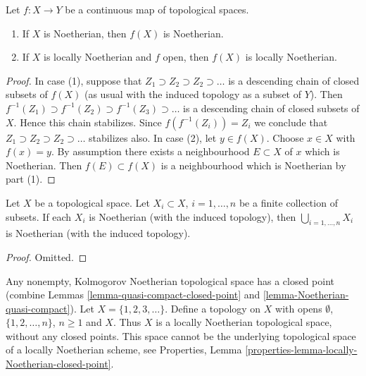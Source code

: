 \begin{lemma}
\label{lemma-image-Noetherian}
Let $f : X \to Y$ be a continuous map of topological spaces.
\begin{enumerate}
\item If $X$ is Noetherian, then $f(X)$ is Noetherian.
\item If $X$ is locally Noetherian and $f$ open, then $f(X)$ is
locally Noetherian.
\end{enumerate}
\end{lemma}

\begin{proof}
In case (1), suppose that $Z_1 \supset Z_2 \supset Z_2 \supset \ldots$
is a descending chain of closed subsets of $f(X)$ (as usual with the induced
topology as a subset of $Y$). Then
$f^{-1}(Z_1) \supset f^{-1}(Z_2) \supset f^{-1}(Z_3) \supset \ldots$ is
a descending chain of closed subsets of $X$. Hence this chain stabilizes.
Since $f(f^{-1}(Z_i)) = Z_i$ we conclude that
$Z_1 \supset Z_2 \supset Z_2 \supset \ldots$
stabilizes also. In case (2), let $y \in f(X)$. Choose $x \in X$ with
$f(x) = y$. By assumption there exists a neighbourhood $E \subset X$ of
$x$ which is Noetherian. Then $f(E) \subset f(X)$ is a neighbourhood
which is Noetherian by part (1).
\end{proof}

\begin{lemma}
\label{lemma-finite-union-Noetherian}
Let $X$ be a topological space.
Let $X_i \subset X$, $i = 1, \ldots, n$ be a finite collection of subsets.
If each $X_i$ is Noetherian (with the induced topology), then
$\bigcup_{i = 1, \ldots, n}  X_i$ is Noetherian (with the induced topology).
\end{lemma}

\begin{proof}
Omitted.
\end{proof}

\begin{example}
\label{example-locally-Noetherian-no-closed-point}
Any nonempty, Kolmogorov Noetherian topological space has a closed point
(combine Lemmas \ref{lemma-quasi-compact-closed-point} and
\ref{lemma-Noetherian-quasi-compact}).
Let $X = \{1, 2, 3, \ldots \}$. Define a topology on $X$
with opens $\emptyset$, $\{1, 2, \ldots, n\}$, $n \geq 1$
and $X$. Thus $X$ is a locally Noetherian topological space,
without any closed points. This space cannot be the underlying
topological space of a locally Noetherian scheme, see
Properties, Lemma \ref{properties-lemma-locally-Noetherian-closed-point}.
\end{example}

